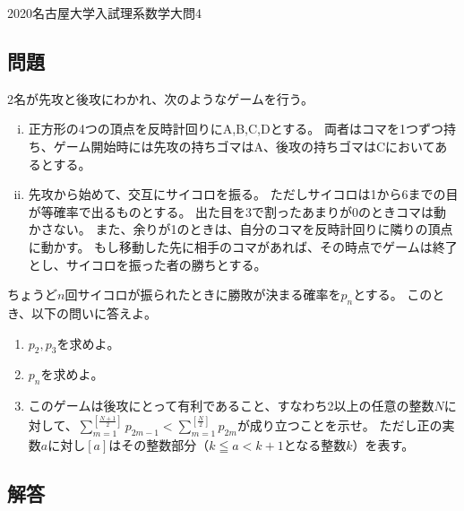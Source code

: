 \documentclass{jsarticle}
\begin{document}
\begin{center}
	{\large 2020名古屋大学入試理系数学大問4}
\end{center}
\subsection*{問題}
2名が先攻と後攻にわかれ、次のようなゲームを行う。
\begin{enumerate}[(i)]
	\item 正方形の4つの頂点を反時計回りにA,B,C,Dとする。
				両者はコマを1つずつ持ち、ゲーム開始時には先攻の持ちゴマはA、後攻の持ちゴマはCにおいてあるとする。
	\item 先攻から始めて、交互にサイコロを振る。
				ただしサイコロは1から6までの目が等確率で出るものとする。
				出た目を3で割ったあまりが0のときコマは動かさない。
				また、余りが1のときは、自分のコマを反時計回りに隣りの頂点に動かす。
				もし移動した先に相手のコマがあれば、その時点でゲームは終了とし、サイコロを振った者の勝ちとする。
\end{enumerate}
ちょうど$n$回サイコロが振られたときに勝敗が決まる確率を$p_n$とする。
このとき、以下の問いに答えよ。
\begin{enumerate}[(1)]
	\item $p_2,p_3$を求めよ。
	\item $p_n$を求めよ。
	\item このゲームは後攻にとって有利であること、すなわち2以上の任意の整数$N$に対して、$\displaystyle \sum_{m=1}^{[\frac{N+1}{2}]}p_{2m-1}<\sum_{m=1}^{[\frac{N}{2}]}p_{2m}$が成り立つことを示せ。
				ただし正の実数$a$に対し$[a]$はその整数部分（$k\leqq a<k+1$となる整数$k$）を表す。
\end{enumerate}

\subsection*{解答}
\end{document}
